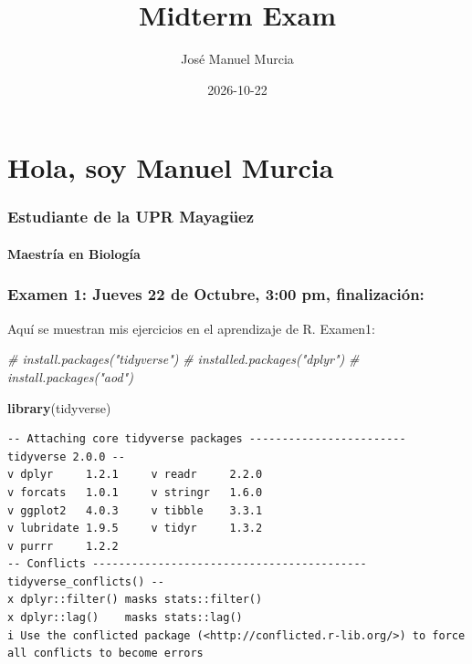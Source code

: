 \documentclass[
]{article}
\title{Midterm Exam}
\author{José Manuel Murcia}
\date{2026-10-22}
\newenvironment{Shaded}{\begin{snugshade}}{\end{snugshade}}
\newcommand{\CommentTok}[1]{\textcolor[rgb]{0.56,0.35,0.01}{\textit{#1}}}
\newcommand{\FunctionTok}[1]{\textcolor[rgb]{0.13,0.29,0.53}{\textbf{#1}}}
\newcommand{\NormalTok}[1]{#1}
\begin{document}
\maketitle

\section{Hola, soy Manuel Murcia}\label{hola-soy-manuel-murcia}

\subsubsection{Estudiante de la UPR
Mayagüez}\label{estudiante-de-la-upr-mayaguxfcez}

\paragraph{Maestría en Biología}\label{maestruxeda-en-biologuxeda}

\subsubsection{Examen 1: Jueves 22 de Octubre, 3:00 pm,
finalización:}\label{examen-1-jueves-22-de-octubre-300-pm-finalizaciuxf3n}

Aquí se muestran mis ejercicios en el aprendizaje de R. Examen1:

\begin{Shaded}
\begin{Highlighting}[]
\CommentTok{\# install.packages("tidyverse")}
\CommentTok{\# installed.packages("dplyr")}
\CommentTok{\# install.packages("aod")}

\FunctionTok{library}\NormalTok{(tidyverse)}
\end{Highlighting}
\end{Shaded}

\begin{verbatim}
-- Attaching core tidyverse packages ------------------------ tidyverse 2.0.0 --
v dplyr     1.2.1     v readr     2.2.0
v forcats   1.0.1     v stringr   1.6.0
v ggplot2   4.0.3     v tibble    3.3.1
v lubridate 1.9.5     v tidyr     1.3.2
v purrr     1.2.2     
-- Conflicts ------------------------------------------ tidyverse_conflicts() --
x dplyr::filter() masks stats::filter()
x dplyr::lag()    masks stats::lag()
i Use the conflicted package (<http://conflicted.r-lib.org/>) to force all conflicts to become errors
\end{verbatim}
\end{document}

